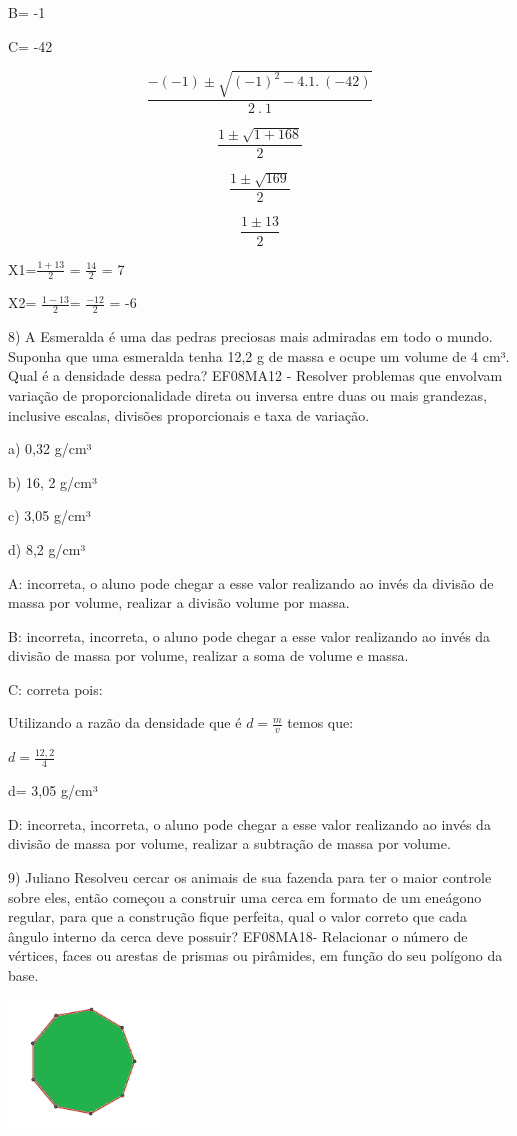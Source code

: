 {B= -1

C= -42

\[\frac{- ( - 1) \pm \sqrt{{( - 1)}^{2} - 4.1.\ ( - 42)}}{2\ .\ 1}\]

\[\frac{1 \pm \sqrt{1 + 168}}{2}\]

\[\frac{1 \pm \sqrt{169}}{2}\]

\[\frac{1 \pm 13}{2}\]

X1=\(\frac{1 + 13}{2}\) = \(\frac{14}{2}\) = 7

X2= \(\frac{1 - 13}{2}\)= \(\frac{- 12}{2}\) = -6

8) A Esmeralda é uma das pedras preciosas mais admiradas em todo o
mundo. Suponha que uma esmeralda tenha 12,2 g de massa e ocupe um volume
de 4 cm³. Qual é a densidade dessa pedra? EF08MA12 - Resolver problemas
que envolvam variação de proporcionalidade direta ou inversa entre duas
ou mais grandezas, inclusive escalas, divisões proporcionais e taxa de
variação.

a) 0,32 g/cm³

b) 16, 2 g/cm³

c) 3,05 g/cm³

d) 8,2 g/cm³

A: incorreta, o aluno pode chegar a esse valor realizando ao invés da
divisão de massa por volume, realizar a divisão volume por massa.

B: incorreta, incorreta, o aluno pode chegar a esse valor realizando ao
invés da divisão de massa por volume, realizar a soma de volume e massa.

C: correta pois:

Utilizando a razão da densidade que é \(d = \frac{m}{v}\) temos que:

\(d = \frac{12,2}{4}\)

d= 3,05 g/cm³

D: incorreta, incorreta, o aluno pode chegar a esse valor realizando ao
invés da divisão de massa por volume, realizar a subtração de massa por
volume.

9) Juliano Resolveu cercar os animais de sua fazenda para ter o maior
controle sobre eles, então começou a construir uma cerca em formato de
um eneágono regular, para que a construção fique perfeita, qual o valor
correto que cada ângulo interno da cerca deve possuir? EF08MA18-
Relacionar o número de vértices, faces ou arestas de prismas ou
pirâmides, em função do seu polígono da base.

\includegraphics[width=1.575in,height=1.33385in]{./imgSAEB_8_MAT/media/image60.png}

}
